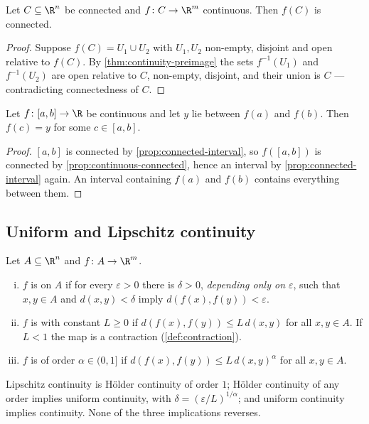 \begin{proposition}\label{prop:continuous-connected}
	Let $C\subseteq\R^n$ be connected and $f\colon C\to\R^m$ continuous. Then $f(C)$
	is connected.
\end{proposition}

\begin{proof}
	Suppose $f(C)=U_1\cup U_2$ with $U_1,U_2$ non-empty, disjoint and open relative
	to $f(C)$. By \autoref{thm:continuity-preimage} the sets $f^{-1}(U_1)$ and
	$f^{-1}(U_2)$ are open relative to $C$, non-empty, disjoint, and their union is
	$C$ --- contradicting connectedness of $C$.
\end{proof}

\begin{corollary}\label{cor:ivt}
	Let $f\colon[a,b]\to\R$ be continuous and let $y$ lie between $f(a)$ and $f(b)$.
	Then $f(c)=y$ for some $c\in[a,b]$.
\end{corollary}

\begin{proof}
	$[a,b]$ is connected by \autoref{prop:connected-interval}, so $f([a,b])$ is
	connected by \autoref{prop:continuous-connected}, hence an interval by
	\autoref{prop:connected-interval} again. An interval containing $f(a)$ and
	$f(b)$ contains everything between them.
\end{proof}

\subsection{Uniform and Lipschitz continuity}

\begin{definition}\label{def:uniform-continuity}
	Let $A\subseteq\R^n$ and $f\colon A\to\R^m$.
	\begin{enumerate}[(i)]
		\item $f$ is  on $A$ if for
		      every $\varepsilon>0$ there is $\delta>0$, \emph{depending only on
			      $\varepsilon$}, such that $x,y\in A$ and $d(x,y)<\delta$ imply
		      $d(f(x),f(y))<\varepsilon$.
		\item $f$ is  with constant
		      $L\geq0$ if $d(f(x),f(y))\leq L\,d(x,y)$ for all $x,y\in A$. If
		      $L<1$ the map is a contraction (\autoref{def:contraction}).
		\item $f$ is 
		      of order $\alpha\in(0,1]$ if $d(f(x),f(y))\leq L\,d(x,y)^\alpha$ for all
		      $x,y\in A$.
	\end{enumerate}
	Lipschitz continuity is H\"older continuity of order $1$; H\"older continuity of
	any order implies uniform continuity, with
	$\delta=(\varepsilon/L)^{1/\alpha}$; and uniform continuity implies continuity.
	None of the three implications reverses.
\end{definition}

